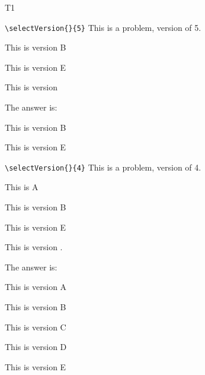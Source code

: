 \documentclass{article}
\begin{document}
\begin{exam}{T1}
\begin{problem*}[2ea]
\begin{parts}
    \item \verb!\selectVersion{}{5}! This is a problem, version  of 5.
\begin{verB}
This is version B
\end{verB}
\begin{verE}
This is version E
\end{verE}
\begin{solution}
This is version 

The answer is:
\begin{verB}
This is version B
\end{verB}
\begin{verE}
This is version E
\end{verE}
\end{solution}

    \item \verb!\selectVersion{}{4}! This is a problem, version  of 4.
\begin{verA}
This is A
\end{verA}
\begin{verB}
This is version B
\end{verB}
\begin{verE}
This is version E
\end{verE}
\begin{solution}
This is version .

The answer is:
\begin{verA}
This is version A
\end{verA}
\begin{verB}
This is version B
\end{verB}
\begin{verC}
This is version C
\end{verC}
\begin{verD}
This is version D
\end{verD}
\begin{verE}
This is version E
\end{verE}
\end{solution}
\end{parts}
\end{problem*}


\end{exam}
\end{document}
